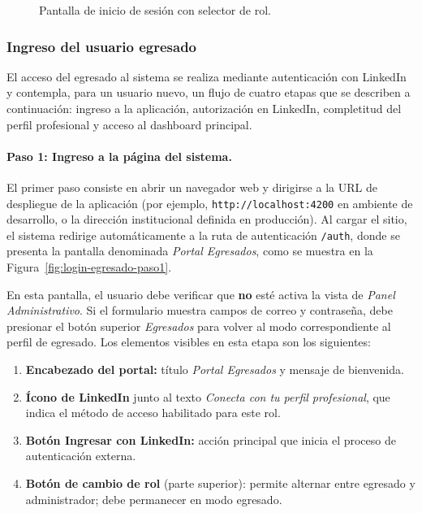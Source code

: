 \begin{figure}[H]
\centering
\caption{Pantalla de inicio de sesión con selector de rol.}
\label{fig:login}
\end{figure}

\subsubsection{Ingreso del usuario egresado}

El acceso del egresado al sistema se realiza mediante autenticación con LinkedIn y contempla, para un usuario nuevo, un flujo de cuatro etapas que se describen a continuación: ingreso a la aplicación, autorización en LinkedIn, completitud del perfil profesional y acceso al dashboard principal.

\paragraph{Paso 1: Ingreso a la página del sistema.}

El primer paso consiste en abrir un navegador web y dirigirse a la URL de despliegue de la aplicación (por ejemplo, \texttt{http://localhost:4200} en ambiente de desarrollo, o la dirección institucional definida en producción). Al cargar el sitio, el sistema redirige automáticamente a la ruta de autenticación \texttt{/auth}, donde se presenta la pantalla denominada \emph{Portal Egresados}, como se muestra en la Figura~\ref{fig:login-egresado-paso1}.

En esta pantalla, el usuario debe verificar que \textbf{no} esté activa la vista de \emph{Panel Administrativo}. Si el formulario muestra campos de correo y contraseña, debe presionar el botón superior \emph{Egresados} para volver al modo correspondiente al perfil de egresado. Los elementos visibles en esta etapa son los siguientes:

\begin{enumerate}
\item \textbf{Encabezado del portal:} título \emph{Portal Egresados} y mensaje de bienvenida.
\item \textbf{Ícono de LinkedIn} junto al texto \emph{Conecta con tu perfil profesional}, que indica el método de acceso habilitado para este rol.
\item \textbf{Botón Ingresar con LinkedIn:} acción principal que inicia el proceso de autenticación externa.
\item \textbf{Botón de cambio de rol} (parte superior): permite alternar entre egresado y administrador; debe permanecer en modo egresado.
\end{enumerate}

